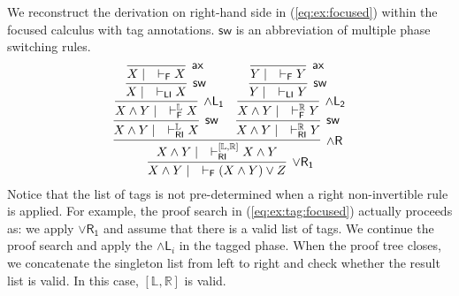 \documentclass[submission,copyright,creativecommons]{eptcs}
\theoremstyle{definition}
\newcommand{\andlone}{\land \mathsf{L_{1}}}
\newcommand{\andltwo}{\land \mathsf{L_{2}}}
\newcommand{\andli}{\land \mathsf{L}_{i}}
\newcommand{\andr}{\land \mathsf{R}}
\newcommand{\orrone}{\lor \mathsf{R_{1}}}
\newcommand{\ax}{\mathsf{ax}}
\newcommand{\RI}{\mathsf{RI}}
\newcommand{\LI}{\mathsf{LI}}
\newcommand{\F}{\mathsf{F}}
\newcommand{\sw}{\mathsf{sw}}
\newcommand{\tL}{\mathbb{L}}
\newcommand{\tR}{\mathbb{R}}
\begin{document}
We reconstruct the derivation on right-hand side in (\ref{eq:ex:focused}) within the focused calculus with tag annotations.
$\sw$ is an abbreviation of multiple phase switching rules.
\begin{equation}\label{eq:ex:tag:focused}
  \infer[\orrone]{X \land Y \mid \quad \vdash_{\F} (X \land Y) \lor Z}{
    \infer[\andr]{X \land Y \mid \quad \vdash^{[ \tL , \tR ]}_{\RI} X \land Y}{
      \infer[\sw]{X \land Y \mid \quad \vdash^{\tL}_{\RI} X}{
        \infer[\andlone]{X \land Y \mid \quad \vdash^{\tL}_{\F} X}{
          \infer[\sw]{X \mid \quad \vdash_{\LI} X}{
            \infer[\ax]{X \mid \quad \vdash_{\F} X}{}
          }
        }
      }
      &
      \infer[\sw]{X \land Y \mid \quad \vdash^{\tR}_{\RI} Y}{
        \infer[\andltwo]{X \land Y \mid \quad \vdash^{\tR}_{\F} Y}{
          \infer[\sw]{Y \mid \quad \vdash_{\LI} Y}{
            \infer[\ax]{Y \mid \quad \vdash_{\F} Y}{}
          }
        }
      }
    }
  }
\end{equation}
Notice that the list of tags is not pre-determined when a right non-invertible rule is applied.
For example, the proof search in (\ref{eq:ex:tag:focused}) actually proceeds as: we apply $\orrone$ and assume that there is a valid list of tags. We continue the proof search and apply the $\andli$ in the tagged phase. When the proof tree closes, we concatenate the singleton list from left to right and check whether the result list is valid.
In this case, $[ \tL , \tR ]$ is valid.
\end{document}

